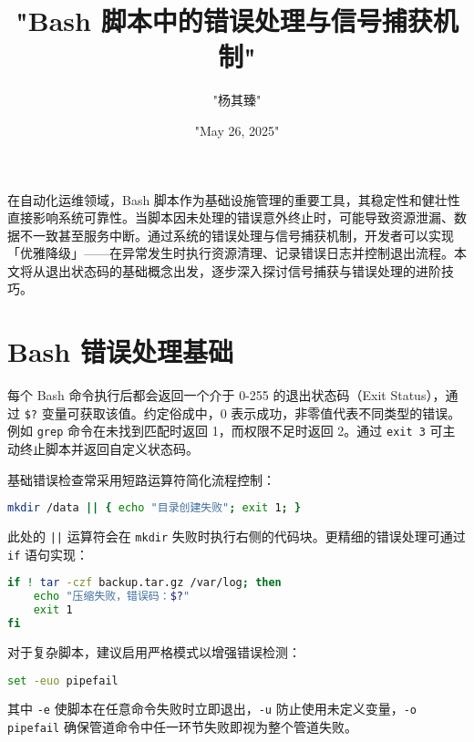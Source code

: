 \title{"Bash 脚本中的错误处理与信号捕获机制"}
\author{"杨其臻"}
\date{"May 26, 2025"}
\maketitle
在自动化运维领域，Bash 脚本作为基础设施管理的重要工具，其稳定性和健壮性直接影响系统可靠性。当脚本因未处理的错误意外终止时，可能导致资源泄漏、数据不一致甚至服务中断。通过系统的错误处理与信号捕获机制，开发者可以实现「优雅降级」——在异常发生时执行资源清理、记录错误日志并控制退出流程。本文将从退出状态码的基础概念出发，逐步深入探讨信号捕获与错误处理的进阶技巧。\par
\chapter{Bash 错误处理基础}
每个 Bash 命令执行后都会返回一个介于 0-255 的退出状态码（Exit Status），通过 \verb!$?! 变量可获取该值。约定俗成中，0 表示成功，非零值代表不同类型的错误。例如 \verb!grep! 命令在未找到匹配时返回 1，而权限不足时返回 2。通过 \verb!exit 3! 可主动终止脚本并返回自定义状态码。\par
基础错误检查常采用短路运算符简化流程控制：\par
\begin{lstlisting}[language=bash]
mkdir /data || { echo "目录创建失败"; exit 1; }
\end{lstlisting}
此处的 \verb!||! 运算符会在 \verb!mkdir! 失败时执行右侧的代码块。更精细的错误处理可通过 \verb!if! 语句实现：\par
\begin{lstlisting}[language=bash]
if ! tar -czf backup.tar.gz /var/log; then
    echo "压缩失败，错误码：$?"
    exit 1
fi
\end{lstlisting}
对于复杂脚本，建议启用严格模式以增强错误检测：\par
\begin{lstlisting}[language=bash]
set -euo pipefail
\end{lstlisting}
其中 \verb!-e! 使脚本在任意命令失败时立即退出，\verb!-u! 防止使用未定义变量，\verb!-o pipefail! 确保管道命令中任一环节失败即视为整个管道失败。\par

